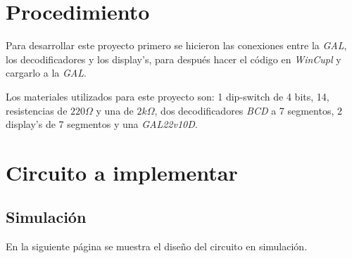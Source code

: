 \documentclass[12pt, oneside, openany]{article}
\begin{document}
\section{Procedimiento}
{\sffamily\large
    \hspace{0.5cm} Para desarrollar este proyecto primero se hicieron las conexiones entre
    la \emph{GAL}, los decodificadores y los display's, para después hacer el código en
    \emph{WinCupl} y cargarlo a la \emph{GAL}.

    \hspace{0.5cm} Los materiales utilizados para este proyecto son: 1 dip-switch de 4
    bits, 14, resistencias de $220\Omega$ y una de $2k\Omega$, dos decodificadores
    \emph{BCD} a 7 segmentos, 2 display's de 7 segmentos y una \emph{GAL22v10D}.

}

\section{Circuito a implementar}
\subsection{Simulación}
{\sffamily\large
    \hspace{0.5cm} En la siguiente página se muestra el diseño del circuito en
    simulación.

    \newpage
    
}
\end{document}
